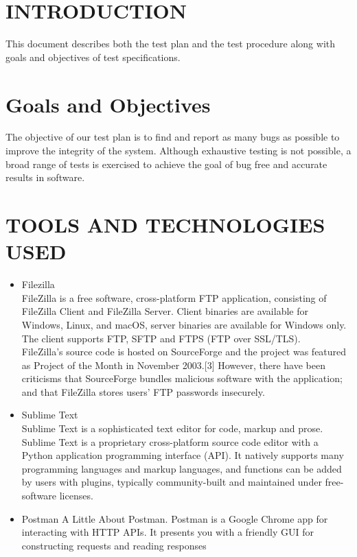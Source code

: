 \documentclass[oneside,a4paper,12pt]{report}
\begin{document}
\section{INTRODUCTION}
This document describes both the test plan and the test procedure along with goals and objectives of test specifications.\\

\section{Goals and Objectives}
The objective of our test plan is to find and report as many bugs as possible to improve the integrity of the system. Although exhaustive testing is not possible, a broad range of tests is exercised to achieve the goal of bug free and accurate results in software.\\

\section{TOOLS AND TECHNOLOGIES USED}
\begin{itemize}
\item Filezilla\\
FileZilla is a free software, cross-platform FTP application, consisting of FileZilla Client and FileZilla Server. Client binaries are available for Windows, Linux, and macOS, server binaries are available for Windows only. The client supports FTP, SFTP and FTPS (FTP over SSL/TLS).\\
FileZilla's source code is hosted on SourceForge and the project was featured as Project of the Month in November 2003.[3] However, there have been criticisms that SourceForge bundles malicious software with the application; and that FileZilla stores users' FTP passwords insecurely.
\item Sublime Text\\
Sublime Text is a sophisticated text editor for code, markup and prose.
Sublime Text is a proprietary cross-platform source code editor with a Python application programming interface (API). It natively supports many programming languages and markup languages, and functions can be added by users with plugins, typically community-built and maintained under free-software licenses.
\item Postman
A Little About Postman. Postman is a Google Chrome app for interacting with HTTP APIs. It presents you with a friendly GUI for constructing requests and reading responses

\end{itemize}
\newpage
\end{document}
